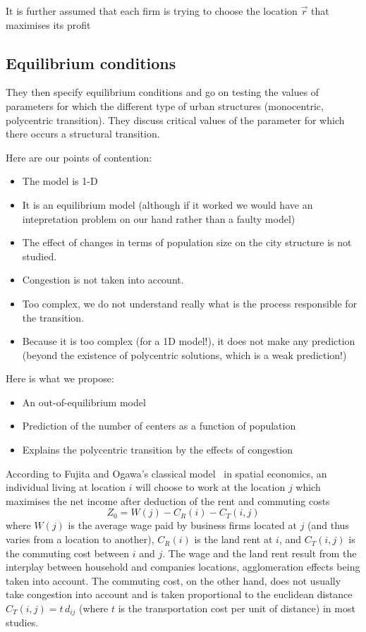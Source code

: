 It is further assumed that each firm is trying to choose the location $\vec{r}$
that maximises its profit

\subsection{Equilibrium conditions}
\label{sub:equilibrium_conditions}

They then specify equilibrium conditions and go on testing the values of
parameters for which the different type of urban structures (monocentric,
polycentric transition). They discuss critical values of the parameter for which
there occurs a structural transition.

Here are our points of contention:

\begin{itemize}
    \item The model is 1-D
    \item It is an equilibrium model (although if it worked we would have an
        intepretation problem on our hand rather than a faulty model)
    \item The effect of changes in terms of population size on the city
        structure is not studied.
    \item Congestion is not taken into account.
    \item Too complex, we do not understand really what is the process
        responsible for the transition.
    \item Because it is too complex (for a 1D model!), it does not make any
        prediction (beyond the existence of polycentric solutions, which is a
        weak prediction!)
\end{itemize}


Here is what we propose:

\begin{itemize}
    \item An out-of-equilibrium model
    \item Prediction of the number of centers as a function of population
    \item Explains the polycentric transition by the effects of congestion
\end{itemize}

According to Fujita and Ogawa's classical model~\cite{Fujita:1982} in
spatial economics, an individual living at location $i$ will choose to
work at the location $j$ which maximises the net income after
deduction of the rent and commuting costs~\cite{Fujita:1982}
%
\begin{equation}
Z_0=W(j)-C_R(i)-C_T(i,j)
\end{equation} 
%
where $W(j)$ is the average wage paid by business firms located at $j$
(and thus varies from a location to another), $C_R(i)$ is the land
rent at $i$, and $C_T(i,j)$ is the commuting cost between $i$ and
$j$. The wage and the land rent result from the interplay between
household and companies locations, agglomeration effects being taken
into account. The commuting cost, on the other hand, does not usually take congestion 
into account and is taken proportional to the euclidean distance
$C_T(i,j) = t\, d_{ij}$ (where $t$ is the transportation cost per unit
of distance) in most studies.

